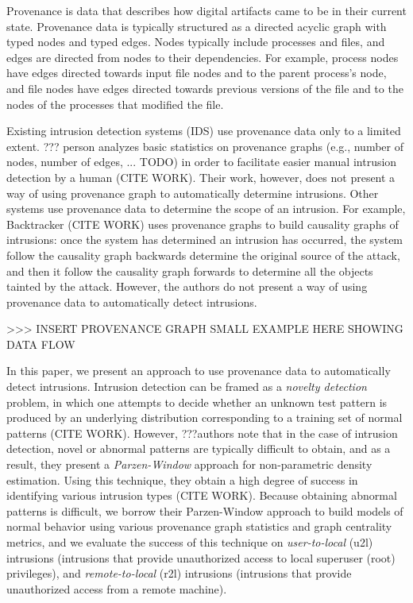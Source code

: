 \documentclass[10pt,twocolumn]{article}
\begin{document}
Provenance is data that describes how digital artifacts
came to be in their current state. Provenance data is typically structured as a directed acyclic graph with
typed nodes and typed edges.
Nodes typically include processes and files, and edges are directed from nodes to their dependencies. For example,
process nodes have edges directed towards input file nodes and to the parent process's node, and
file nodes have edges directed towards previous versions of the file and to the nodes of the
processes that modified the file.

Existing intrusion detection systems (IDS) use provenance data only to a limited extent.
??? person analyzes
basic statistics on provenance graphs (e.g., number of nodes, number of edges, ... TODO) in order to facilitate
easier manual intrusion detection by a human (CITE WORK). Their work, however, does not present a way of using provenance
graph to automatically determine intrusions. Other systems use provenance data to determine the scope of an
intrusion. For example, Backtracker (CITE WORK) uses provenance graphs to build causality graphs of intrusions: once the
system has
determined an intrusion has occurred, the system follow the causality graph backwards determine the original source of the attack, and 
then it follow the causality graph forwards to determine all the objects tainted by the attack. However, the authors 
do not present a way of using provenance data to automatically detect intrusions.


>>> INSERT PROVENANCE GRAPH SMALL EXAMPLE HERE SHOWING DATA FLOW

In this paper, we present an approach to use provenance data to automatically detect intrusions. Intrusion
detection can be framed as a {\em novelty detection} problem, in which one attempts to decide whether
an unknown test pattern is produced by an underlying distribution corresponding to a training set
of normal patterns (CITE WORK). However, ???authors note that in the case of intrusion detection, novel
or abnormal patterns are typically difficult to obtain, and as a result, they present a {\em Parzen-Window} approach
for non-parametric density estimation. Using this technique, they obtain a high degree of success
in identifying various intrusion types (CITE WORK). Because obtaining abnormal patterns is difficult, 
we borrow their Parzen-Window approach to build models of normal behavior using 
various provenance graph statistics and graph centrality metrics, and we evaluate the success of this technique
on {\em user-to-local} (u2l) intrusions (intrusions that provide unauthorized access to local superuser (root) privileges),
and {\em remote-to-local} (r2l) intrusions (intrusions that provide unauthorized access from a remote machine).
\end{document}
